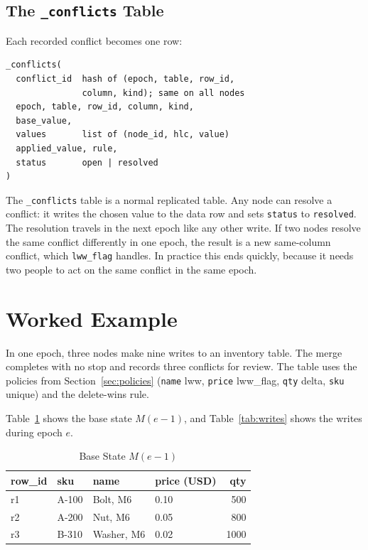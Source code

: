 \documentclass[journal]{IEEEtran}
\newcommand{\code}[1]{\texttt{#1}}
\begin{document}
\subsection{The \texttt{\_conflicts} Table}
Each recorded conflict becomes one row:
\begin{lstlisting}
_conflicts(
  conflict_id  hash of (epoch, table, row_id,
               column, kind); same on all nodes
  epoch, table, row_id, column, kind,
  base_value,
  values       list of (node_id, hlc, value)
  applied_value, rule,
  status       open | resolved
)
\end{lstlisting}
The \code{\_conflicts} table is a normal replicated table. Any node can resolve a conflict: it writes the chosen value to the data row and sets \code{status} to \code{resolved}. The resolution travels in the next epoch like any other write. If two nodes resolve the same conflict differently in one epoch, the result is a new same-column conflict, which \code{lww\_flag} handles. In practice this ends quickly, because it needs two people to act on the same conflict in the same epoch.

\section{Worked Example}
In one epoch, three nodes make nine writes to an inventory table. The merge completes with no stop and records three conflicts for review. The table uses the policies from Section~\ref{sec:policies} (\code{name} lww, \code{price} lww\_flag, \code{qty} delta, \code{sku} unique) and the delete-wins rule.

Table~\ref{tab:base} shows the base state $M(e{-}1)$, and Table~\ref{tab:writes} shows the writes during epoch $e$.

\begin{table}[t]
\caption{Base State $M(e{-}1)$}\label{tab:base}
\centering\small
\begin{tabular}{@{}llllr@{}}
\toprule
row\_id & sku & name & price (USD) & qty\\
\midrule
r1 & A-100 & Bolt, M6 & 0.10 & 500\\
r2 & A-200 & Nut, M6 & 0.05 & 800\\
r3 & B-310 & Washer, M6 & 0.02 & 1000\\
\bottomrule
\end{tabular}
\end{table}
\end{document}
